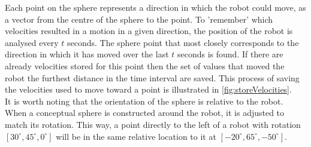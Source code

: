 \documentclass{article}
\begin{document}
Each point on the sphere represents a direction in which the robot could move, as a vector from the centre of the sphere to the point. To 'remember' which velocities resulted in a motion in a given direction, the position of the robot is analysed every $t$ seconds. The sphere point that most closely corresponds to the direction in which it has moved over the last $t$ seconds is found. If there are already velocities stored for this point then the set of values that moved the robot the furthest distance in the time interval are saved. This process of saving the velocities used to move toward a point is illustrated in \autoref{fig:storeVelocities}. \\

\noindent It is worth noting that the orientation of the sphere is relative to the robot. When a conceptual sphere is constructed around the robot, it is adjusted to match its rotation. This way, a point directly to the left of a robot with rotation $[30^\circ, 45^\circ, 0^\circ]$ will be in the same relative location to it at $[-20^\circ, 65^\circ, -50^\circ]$. \\
\end{document}
